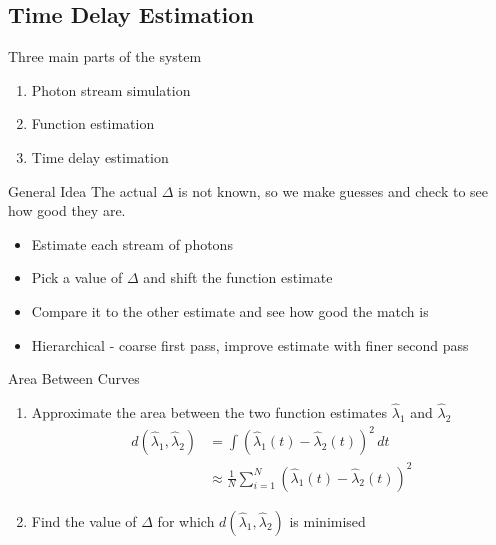 \documentclass{beamer}
\begin{document}

\subsection{Time Delay Estimation}

\begin{frame}
  Three main parts of the system
  \begin{enumerate}
  \item Photon stream simulation
  \item Function estimation
  \item \alert{Time delay estimation}
  \end{enumerate}
\end{frame}

\begin{frame}{General Idea}
  The actual $\Delta$ is not known, so we make guesses and check to see how good
  they are.
  \begin{itemize}[<+->]
  \item Estimate each stream of photons
  \item Pick a value of $\Delta$ and shift the function estimate
  \item Compare it to the other estimate and see how good the match is
  \item Hierarchical - coarse first pass, improve estimate with finer second pass
  \end{itemize}
\end{frame}

\begin{frame}{Area Between Curves}
  \begin{enumerate}[<+->]
  \item Approximate the area between the two function estimates $\hat{\lambda}_1$
    and $\hat{\lambda}_2$
    \begin{align*}
      d(\hat{\lambda}_1,\hat{\lambda}_2)&=\int(\hat{\lambda}_1(t)-\hat{\lambda}_2(t))^2\,dt\\
      &\approx\frac{1}{N}\sum_{i=1}^N(\hat{\lambda}_1(t)-\hat{\lambda}_2(t))^2
    \end{align*}
  \item Find the value of $\Delta$ for which
    $d(\hat{\lambda}_1,\hat{\lambda}_2)$ is minimised
  \end{enumerate}
\end{frame}
\end{document}
